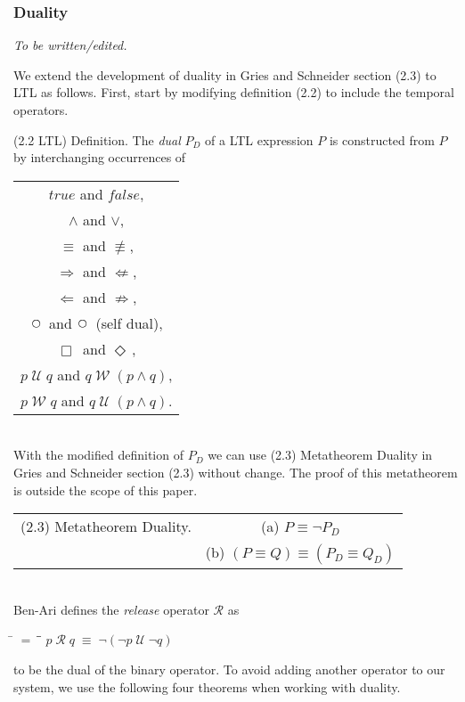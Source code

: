 \documentclass[12pt, fleqn, leqno]{article}
\newcommand{\lllgap}{12pt}                          %
\newcommand{\mymathindent}{24pt}                    %
\newcommand{\equivs}{\ensuremath{\;\equiv\;}}       %
\newcommand{\nequiv}{\ensuremath{\not\equiv}}       %
\newcommand{\impl}{\ensuremath{\Rightarrow}}        %
\newcommand{\nimpl}{\ensuremath{\not\Rightarrow}}   %
\newcommand{\foll}{\ensuremath{\Leftarrow}}         %
\newcommand{\nfoll}{\ensuremath{\not\Leftarrow}}    %
\newcommand{\Until}{\;\mathcal{U}\;}
\newcommand{\Wait}{\;\mathcal{W}\;}
\newcommand{\Next}{\;\,\text{\raisebox{3.5pt}{\circle{6}}}}
\newcommand{\Event}{\Diamond\,}
\newcommand{\Always}{\Box\,}
\newcommand{\myqedtab}{\hspace{384pt}}              %
\begin{document}
\subsubsection*{Duality}\label{section-duality}

\textit{To be written/edited.}

We extend the development of duality in Gries and Schneider \cite{LADM} section (2.3) to LTL as follows.
First, start by modifying definition (2.2) to include the temporal operators.

(2.2 LTL) Definition. The \textit{dual} $P_D$ of a LTL expression $P$ is constructed from $P$ by interchanging occurrences of\\[\lllgap]
\begin{tabular}{c}
$true$ and $false$,\\
$\land$ and $\lor$,\\
$\equiv$ and $\nequiv$,\\
$\impl$ and $\nfoll$,\\
$\foll$ and $\nimpl$,\\
$\Next$ and $\Next$ (self dual),\\
$\Always$ and $\Event$,\\
$p \Until q$ and $q \Wait (p \land q)$,\\
$p \Wait q$ and $q \Until (p \land q)$.
\end{tabular}\\[\lllgap]

With the modified definition of $P_D$ we can use (2.3) Metatheorem Duality in Gries and Schneider \cite{LADM} 
section (2.3) without change.
The proof of this metatheorem is outside the scope of this paper.\\[\lllgap]

 \begin{tabular}{cc}
(2.3) Metatheorem Duality.
&(a) $P \equiv \neg P_D$\\
&(b) $(P \equiv Q) \equiv (P_D \equiv Q_D)$
\end{tabular}\\[\lllgap]

Ben-Ari \cite{Ben} defines the \textit{release} operator $\mathcal{R}$ as
\begin{tabbing}
\hspace{\mymathindent} \= $= \;$ \= \myqedtab \= \kill
  \> $p\;\mathcal{R}\; q\equivs \neg(\neg p \Until \neg q)$
\end{tabbing}
to be the dual of the binary operator.
To avoid adding another operator to our system, we use the following four theorems
when working with duality.
\end{document}

